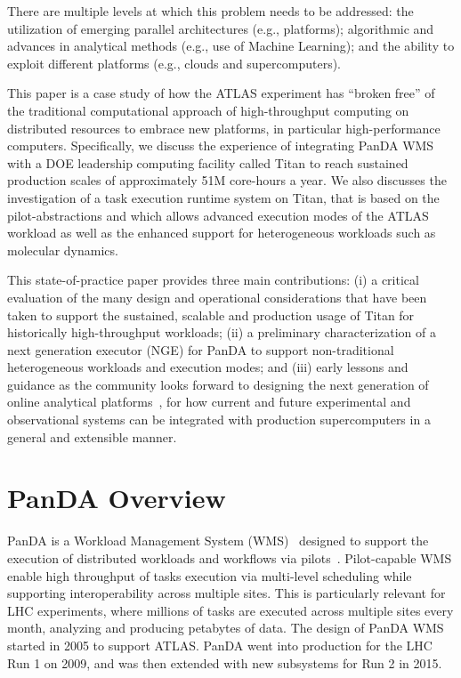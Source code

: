 \documentclass[conference]{IEEEtran}
\begin{document}
There are multiple levels at which this problem needs to be addressed: the
utilization of emerging parallel architectures (e.g., platforms); algorithmic
and advances in analytical methods (e.g., use of Machine Learning); and the
ability to exploit different platforms (e.g., clouds and supercomputers).

This paper is a case study of how the ATLAS experiment has ``broken free'' of
the traditional computational approach of high-throughput computing on
distributed resources to embrace new platforms, in particular high-performance
computers. Specifically, we discuss the experience of integrating PanDA WMS with
a DOE leadership computing facility called Titan to reach sustained production
scales of approximately 51M core-hours a year. We also discusses the
investigation of a task execution runtime system on Titan, that is based on the
pilot-abstractions and which allows advanced execution modes of the ATLAS
workload as well as the enhanced support for heterogeneous workloads such as
molecular dynamics.

This state-of-practice paper provides three main contributions:  (i) a critical
evaluation of the many design and operational considerations that have been
taken to support the sustained, scalable and production usage of Titan for
historically high-throughput workloads; (ii) a preliminary characterization of a
next generation executor (NGE) for PanDA to support non-traditional
heterogeneous workloads and execution modes;  and (iii) early lessons and
guidance as the community looks forward to designing the next generation of
online analytical platforms~\cite{foap-url}, for how current and future
experimental and observational systems can be integrated with production
supercomputers in a general and extensible manner.

\section{PanDA Overview}
\label{sec:panda_overview}

PanDA is a Workload Management System (WMS)~\cite{marco2009glite} designed to
support the execution of distributed workloads and workflows via
pilots~\cite{turilli2015comprehensive}. Pilot-capable WMS enable high throughput
of tasks execution via multi-level scheduling while supporting interoperability
across multiple sites. This is particularly relevant for LHC experiments, where
millions of tasks are executed across multiple sites every month, analyzing and
producing petabytes of data. The design of PanDA WMS started in 2005 to support
ATLAS. PanDA went into production for the LHC Run 1 on 2009, and was then
extended with new subsystems for Run 2 in 2015.
\end{document}
